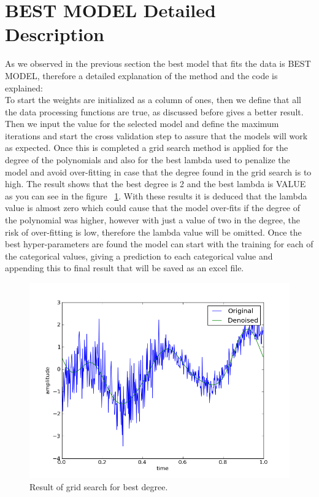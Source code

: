 \documentclass[10pt,conference,compsocconf]{IEEEtran}
\begin{document}
\section{BEST MODEL Detailed Description}
As we observed in the previous section the best model that fits 
the data is BEST MODEL, therefore a detailed explanation of the 
method and the code is explained:\\
To start the weights are initialized as a column of ones, then we define 
that all the data processing functions are true, as discussed before gives
a better result. Then we input the value for the selected model and define
the maximum iterations and start the cross validation step to assure that
the models will work as expected. Once this is completed a grid search
method is applied for the degree of the polynomials and also for the best
lambda used to penalize the model and avoid over-fitting in case that the 
degree found in the grid search is to high. The result shows that the best degree
is 2  and the best lambda is VALUE as you can see in the figure ~\ref{fig:best_degree}. 
With these results it is deduced that the lambda value is almost zero
which could cause that the model over-fits if the degree of the polynomial was
higher, however with just a value of two in the degree, the risk of over-fitting is
low, therefore the lambda value will be omitted. 
Once the best hyper-parameters are found the model can start with the training
for each of the categorical values, giving a prediction to each categorical value
and appending this to final result that will be saved as an excel file.



\begin{figure}[h]
  \centering
  \includegraphics[width=\columnwidth]{denoised_signal_1d}
  \caption{Result of grid search for best degree.}
  \vspace{-3mm}
  \label{fig:best_degree}
\end{figure}
\end{document}
